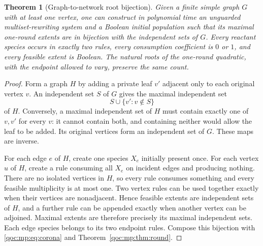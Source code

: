 \documentclass[11pt,letterpaper]{article}
\newtheorem{theorem}{Theorem}[section]
\theoremstyle{definition}
\theoremstyle{remark}
\begin{document}
\begin{theorem}[Graph-to-network root bijection]\label{qoc:mp:thm:graph}
Given a finite simple graph $G$ with at least one vertex, one can construct
in polynomial time an unguarded multiset-rewriting system and a Boolean
initial population such that its maximal one-round extents are in bijection
with the independent sets of $G$. Every reactant species occurs in exactly
two rules, every consumption coefficient is $0$ or $1$, and every
feasible extent is Boolean. The natural roots of the one-round quadratic,
with the endpoint allowed to vary, preserve the same count.
\end{theorem}
\begin{proof}
Form a graph $H$ by adding a private leaf $v'$ adjacent only to each
original vertex $v$. An independent set $S$ of $G$ gives the maximal
independent set
\begin{equation}\label{qoc:mp:eq:corona}
 S\cup\{v':v\notin S\}
\end{equation}
of $H$. Conversely, a maximal independent set of $H$ must contain exactly
one of $v,v'$ for every $v$: it cannot contain both, and containing neither
would allow the leaf to be added. Its original vertices form an
independent set of $G$. These maps are inverse.

For each edge $e$ of $H$, create one species $X_e$ initially present once.
For each vertex $u$ of $H$, create a rule consuming all $X_e$ on incident
edges and producing nothing. There are no isolated vertices in $H$, so
every rule consumes something and every feasible multiplicity is at most
one. Two vertex rules can be used together exactly when their vertices
are nonadjacent. Hence feasible extents are independent sets of $H$,
and a further rule can be appended exactly when another vertex can be
adjoined. Maximal extents are therefore precisely its maximal independent
sets. Each edge species belongs to its two endpoint rules. Compose this
bijection with \eqref{qoc:mp:eq:corona} and Theorem~\ref{qoc:mp:thm:round}.
\end{proof}
\end{document}
